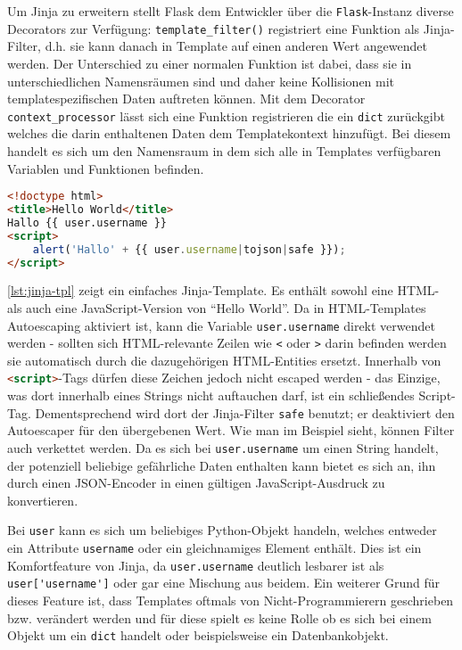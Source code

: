 Um Jinja zu erweitern stellt Flask dem Entwickler über die \lstinline{Flask}-Instanz diverse
Decorators zur Verfügung: \lstinline{template_filter()} registriert eine Funktion als Jinja-Filter,
d.h. sie kann danach in Template auf einen anderen Wert angewendet werden. Der Unterschied zu einer
normalen Funktion ist dabei, dass sie in unterschiedlichen Namensräumen sind und daher keine
Kollisionen mit templatespezifischen Daten auftreten können. Mit dem Decorator
\lstinline{context_processor} lässt sich eine Funktion registrieren die ein \lstinline{dict}
zurückgibt welches die darin enthaltenen Daten dem Templatekontext hinzufügt. Bei diesem handelt es
sich um den Namensraum in dem sich alle in Templates verfügbaren Variablen und Funktionen befinden.

\begin{lstlisting}[language=HTML,caption=Jinja2-Template,label=lst:jinja-tpl]
<!doctype html>
<title>Hello World</title>
Hallo {{ user.username }}
<script>
    alert('Hallo' + {{ user.username|tojson|safe }});
</script>
\end{lstlisting}

\autoref{lst:jinja-tpl} zeigt ein einfaches Jinja-Template. Es enthält sowohl eine HTML- als auch
eine JavaScript-Version von \enquote{Hello World}. Da in HTML-Templates Autoescaping aktiviert ist,
kann die Variable \lstinline{user.username} direkt verwendet werden - sollten sich HTML-relevante
Zeilen wie \lstinline{<} oder \lstinline{>} darin befinden werden sie automatisch durch die
dazugehörigen HTML-Entities ersetzt. Innerhalb von \lstinline[language=HTML]{<script>}-Tags dürfen
diese Zeichen jedoch nicht escaped werden - das Einzige, was dort innerhalb eines Strings nicht
auftauchen darf, ist ein schließendes Script-Tag.  Dementsprechend wird dort der Jinja-Filter
\lstinline{safe} benutzt; er deaktiviert den Autoescaper für den übergebenen Wert. Wie man im
Beispiel sieht, können Filter auch verkettet werden. Da es sich bei \lstinline{user.username} um
einen String handelt, der potenziell beliebige gefährliche Daten enthalten kann bietet es sich an,
ihn durch einen JSON-Encoder in einen gültigen JavaScript-Ausdruck zu konvertieren.

Bei \lstinline{user} kann es sich um beliebiges Python-Objekt handeln, welches entweder ein
Attribute \lstinline{username} oder ein gleichnamiges Element enthält. Dies ist ein Komfortfeature
von Jinja, da \lstinline{user.username} deutlich lesbarer ist als \lstinline{user['username']} oder
gar eine Mischung aus beidem. Ein weiterer Grund für dieses Feature ist, dass Templates oftmals von
Nicht-Programmierern geschrieben bzw. verändert werden und für diese spielt es keine Rolle ob es
sich bei einem Objekt um ein \lstinline{dict} handelt oder beispielsweise ein Datenbankobjekt.

